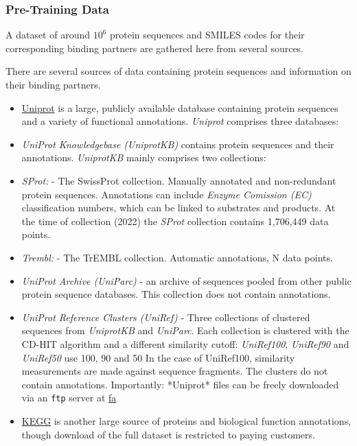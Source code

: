 \documentclass{article}
\begin{document}
\subsubsection{Pre-Training Data}

A dataset of around $10^6$ protein sequences and SMILES codes for their corresponding binding partners are gathered here from several sources.

There are several sources of data containing protein sequences and information on their binding partners.

\begin{itemize}
	\item \href{https://www.uniprot.org/}{Uniprot} is a large, publicly available database containing protein sequences and a variety of functional annotations. 
		\textit{Uniprot} comprises three databases:
	\item \textit{UniProt Knowledgebase (UniprotKB)} contains protein sequences and their annotations.
		\textit{UniprotKB} mainly comprises two collections:
\item \textit{SProt:} - The SwissProt collection. Manually annotated and non-redundant protein sequences. 
	Annotations can include \textit{Enzyme Comission (EC)} classification numbers, which can be linked to substrates and products. 
		At the time of collection (2022) the \textit{SProt} collection contains 1,706,449 data points.
	\item \textit{Trembl:} - The TrEMBL collection. Automatic annotations, N data points.
	\item \textit{UniProt Archive (UniParc)} - an archive of sequences pooled from other public protein sequence databases.
	This collection does not contain annotations.
\item \textit{UniProt Reference Clusters (UniRef)} - Three collections of clustered sequences from \textit{UniprotKB} and \textit{UniParc}. 
	Each collection is clustered with the CD-HIT algorithm and a different similarity cutoff: \textit{UniRef100}, \textit{UniRef90} and \textit{UniRef50} use 100, 90 and 50%
	In the case of UniRef100, similarity measurements are made against sequence fragments.
	The clusters do not contain annotations.
		Importantly: *Uniprot* files can be freely downloaded via an \texttt{ftp} server at \href{https://ftp.uniprot.org/pub/databases/uniprot/current_release/uniref/}{fa}
	\item \href{https://www.genome.jp/kegg/}{KEGG} is another large source of proteins and biological function annotations, though download of the full dataset is restricted to paying customers.

\end{itemize}
\end{document}
